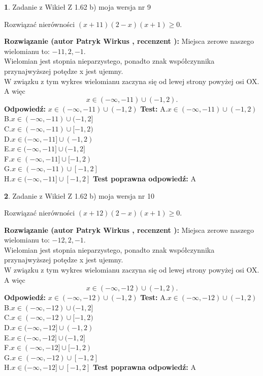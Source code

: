 \documentclass[12pt, a4paper]{article}
\theoremstyle{definition} %
\newtheorem{zad}{}
\newcommand{\zadStart}[1]{\begin{zad}#1\newline}
\newcommand{\zadStop}{\end{zad}}
\newcommand{\rozwStart}[2]{\noindent \textbf{Rozwiązanie (autor #1 , recenzent #2): }\newline}
\newcommand{\rozwStop}{\newline}
\newcommand{\odpStart}{\noindent \textbf{Odpowiedź:}\newline}
\newcommand{\odpStop}{\newline}
\newcommand{\testStart}{\noindent \textbf{Test:}\newline}
\newcommand{\testStop}{\newline}
\newcommand{\kluczStart}{\noindent \textbf{Test poprawna odpowiedź:}\newline}
\newcommand{\kluczStop}{\newline}
\begin{document}
\zadStart{Zadanie z Wikieł Z 1.62 b) moja wersja nr 9}

Rozwiązać nierówności $(x+11)(2-x)(x+1)\ge0$.
\zadStop
\rozwStart{Patryk Wirkus}{}
Miejsca zerowe naszego wielomianu to: $-11, 2, -1$.\\
Wielomian jest stopnia nieparzystego, ponadto znak współczynnika przy\linebreak najwyższej potędze x jest ujemny.\\ W związku z tym wykres wielomianu zaczyna się od lewej strony powyżej osi OX. A więc $$x \in (-\infty,-11) \cup (-1,2).$$
\rozwStop
\odpStart
$x \in (-\infty,-11) \cup (-1,2)$
\odpStop
\testStart
A.$x \in (-\infty,-11) \cup (-1,2)$\\
B.$x \in (-\infty,-11) \cup (-1,2]$\\
C.$x \in (-\infty,-11) \cup [-1,2)$\\
D.$x \in (-\infty,-11] \cup (-1,2)$\\
E.$x \in (-\infty,-11] \cup (-1,2]$\\
F.$x \in (-\infty,-11] \cup [-1,2)$\\
G.$x \in (-\infty,-11) \cup [-1,2]$\\
H.$x \in (-\infty,-11] \cup [-1,2]$
\testStop
\kluczStart
A
\kluczStop



\zadStart{Zadanie z Wikieł Z 1.62 b) moja wersja nr 10}

Rozwiązać nierówności $(x+12)(2-x)(x+1)\ge0$.
\zadStop
\rozwStart{Patryk Wirkus}{}
Miejsca zerowe naszego wielomianu to: $-12, 2, -1$.\\
Wielomian jest stopnia nieparzystego, ponadto znak współczynnika przy\linebreak najwyższej potędze x jest ujemny.\\ W związku z tym wykres wielomianu zaczyna się od lewej strony powyżej osi OX. A więc $$x \in (-\infty,-12) \cup (-1,2).$$
\rozwStop
\odpStart
$x \in (-\infty,-12) \cup (-1,2)$
\odpStop
\testStart
A.$x \in (-\infty,-12) \cup (-1,2)$\\
B.$x \in (-\infty,-12) \cup (-1,2]$\\
C.$x \in (-\infty,-12) \cup [-1,2)$\\
D.$x \in (-\infty,-12] \cup (-1,2)$\\
E.$x \in (-\infty,-12] \cup (-1,2]$\\
F.$x \in (-\infty,-12] \cup [-1,2)$\\
G.$x \in (-\infty,-12) \cup [-1,2]$\\
H.$x \in (-\infty,-12] \cup [-1,2]$
\testStop
\kluczStart
A
\kluczStop
\end{document}
